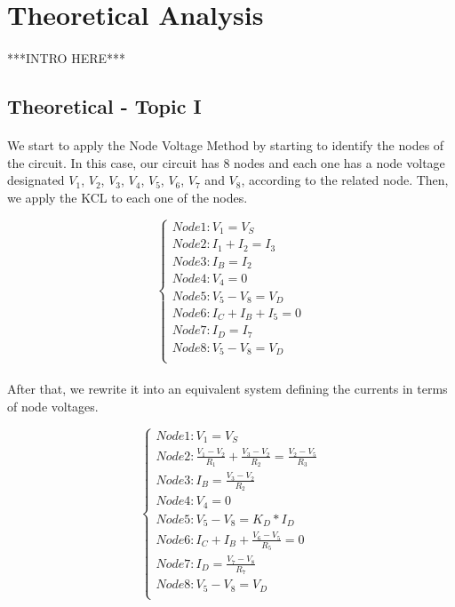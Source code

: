 \section{Theoretical Analysis}
\label{sec:analysis}

\paragraph{}
***INTRO HERE***


\subsection{Theoretical - Topic I}
\label{subsec:first_topic}

\paragraph{}
We start to apply the Node Voltage Method by starting to identify the nodes of the circuit. In this case, our circuit has 8 nodes and each one has a node voltage designated $V_1$, $V_2$, $V_3$, $V_4$, $V_5$, $V_6$, $V_7$ and $V_8$, according to the related node. Then, we apply the KCL to each one of the nodes.

\[
\left\{\begin{matrix}
Node 1: V_1 = V_S\\
Node 2: I_1 + I_2 = I_3\\
Node 3: I_B = I_2\\
Node 4: V_4 = 0\\
Node 5: V_5 -V_8 = V_D\\
Node 6: I_C + I_B + I_5 = 0\\
Node 7: I_D = I_7\\
Node 8: V_5 -V_8 = V_D\\
\end{matrix}\right.
\]

\paragraph{}
After that, we rewrite it into an equivalent system defining the currents in terms of node voltages.

\[
\left\{\begin{matrix}
Node 1: V_1 = V_S\\
Node 2: \frac{V_1-V_2}{R_1} + \frac{V_3-V_2}{R_2} = \frac{V_2-V_5}{R_3}\\
Node 3: I_B = \frac{V_3-V_2}{R_2}\\
Node 4: V_4 = 0\\
Node 5: V_5 -V_8 = K_D*I_D\\
Node 6: I_C + I_B + \frac{V_6-V_5}{R_5} = 0\\
Node 7: I_D = \frac{V_7-V_8}{R_7}\\
Node 8: V_5 -V_8 = V_D\\
\end{matrix}\right.
\]


